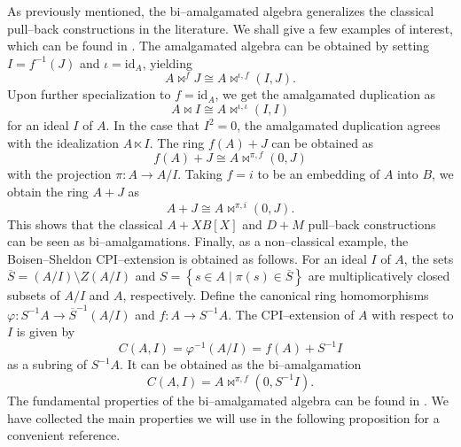\documentclass{amsart}%
\theoremstyle{plain}
\numberwithin{equation}{section}
\theoremstyle{definition}
\begin{document}
As previously mentioned, the bi--amalgamated algebra generalizes the classical pull--back constructions in the literature. We shall give a few examples of interest, which can be found in \cite{KLT}. The amalgamated algebra can be obtained by setting $I=f^{-1}(J)$ and $\iota=\text{id}_A$, yielding
\[
A\bowtie^{f}J\cong A\bowtie^{\iota,f}(I,J).
\]
Upon further specialization to $f=\text{id}_A$, we get the amalgamated duplication as
\[
A\bowtie I\cong A\bowtie^{\iota,\iota}(I,I)
\]
for an ideal $I$ of $A$. In the case that $I^2=0$, the amalgamated duplication agrees with the idealization $A\ltimes I$. The ring $f(A)+J$ can be obtained as
\[
f(A)+J \cong A\bowtie^{\pi,f}(0,J)
\]
with the projection $\pi:A\to A/I$. Taking $f=i$ to be an embedding of $A$ into $B$, we obtain the ring $A+J$ as
\[
A+J \cong A\bowtie^{\pi,i}(0,J).
\]
This shows that the classical $A+XB[X]$ and $D+M$ pull--back constructions can be seen as bi--amalgamations. Finally, as a non--classical example, the Boisen--Sheldon CPI--extension \cite{CPI} is obtained as follows. For an ideal $I$ of $A$, the sets $\overline{S}=(A/I)\setminus Z(A/I)$ and $S=\left\{s\in A \mid \pi(s) \in \overline{S} \right\}$ are multiplicatively closed subsets of $A/I$ and $A$, respectively. Define the canonical ring homomorphisms $\varphi:S^{-1}A \to \overline{S}^{-1}(A/I)$ and $f:A\to S^{-1}A$. The CPI--extension of $A$ with respect to $I$ is given by
\[
C(A,I)=\varphi^{-1}\left(A/I\right)=f(A)+S^{-1}I
\]
as a subring of $S^{-1}A$. It can be obtained as the bi--amalgamation 
\[
C(A,I)=A\bowtie^{\pi,f}\left(0,S^{-1}I\right).
\]
The fundamental properties of the bi--amalgamated algebra can be found in \cite{KLT}. We have collected the main properties we will use in the following proposition for a convenient reference.  
\end{document}
